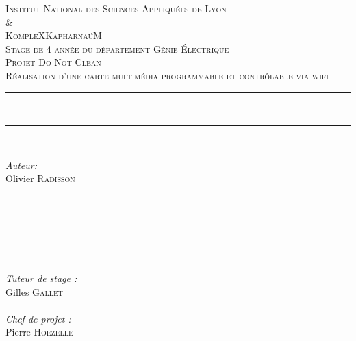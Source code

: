 \begin{titlepage}

\newcommand{\HRule}{\rule{\linewidth}{0.5mm}} %

\center %
 

\textsc{\LARGE Institut National des Sciences Appliquées de Lyon\\
\&\vspace{10pt}~
\\KompleXKapharnaüM}\\[1.0cm] %
\textsc{\small Stage de 4 année du département Génie Électrique} \\[0.2cm]
\textsc{\Large Projet Do Not Clean}
\\[0.5cm] %
\textsc{\large Réalisation d'une carte multimédia programmable et contrôlable via wifi}\\[0.5cm] %


\HRule \\[0.4cm]
{ \huge   \scshape{\doctitle}  } %
\HRule \\[1.5cm]
 

\begin{minipage}{0.4\textwidth}
\begin{flushleft} \large
\emph{Auteur:}\\
Olivier \textsc{Radisson}\\
~ \\
~ \\
~ \\
~ \\
\end{flushleft}
\end{minipage}
~
\begin{minipage}{0.4\textwidth}
\begin{flushright} \large
\emph{Tuteur de stage :} \\
Gilles \textsc{Gallet}
~ \\
~ \\
\emph{Chef de projet :} \\
Pierre \textsc{Hoezelle}
~ \\
~ \\


\end{flushright}
\end{minipage}
\end{titlepage}
